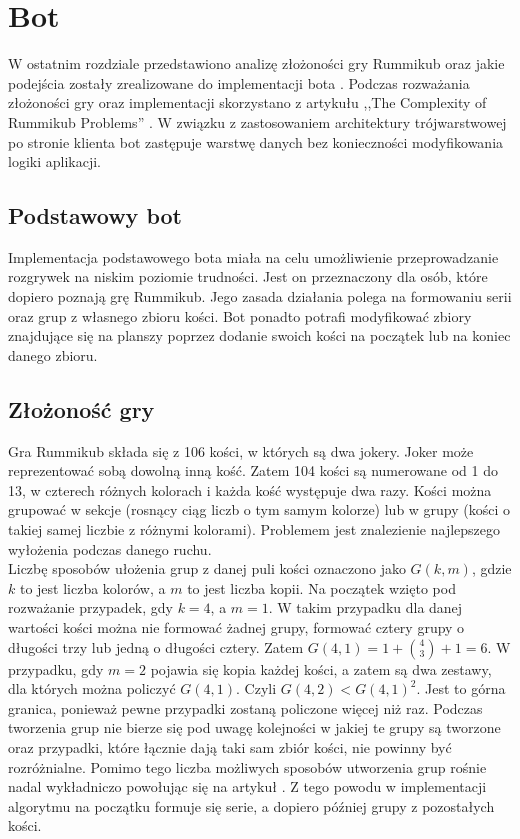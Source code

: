 \chapter{Bot}
\thispagestyle{chapterBeginStyle}

W ostatnim rozdziale przedstawiono analizę złożoności gry Rummikub oraz jakie podejścia zostały zrealizowane do implementacji bota . Podczas rozważania złożoności gry oraz implementacji skorzystano z artykułu ,,The Complexity of Rummikub Problems'' \cite{RummikubComplexity}. W związku z zastosowaniem architektury trójwarstwowej po stronie klienta bot zastępuje  warstwę danych bez konieczności modyfikowania logiki aplikacji.

\section{Podstawowy bot}

Implementacja podstawowego bota miała na celu umożliwienie przeprowadzanie rozgrywek na niskim poziomie trudności. Jest on przeznaczony dla osób, które dopiero poznają grę Rummikub. Jego zasada działania polega na formowaniu serii oraz grup z własnego zbioru kości. Bot ponadto potrafi modyfikować zbiory znajdujące się na planszy poprzez dodanie swoich kości na początek lub na koniec danego zbioru.

\section{Złożoność gry}

Gra Rummikub składa się z 106 kości, w których są dwa jokery. Joker może reprezentować sobą dowolną inną kość. Zatem 104 kości są numerowane od 1 do 13, w czterech różnych kolorach i każda kość występuje dwa razy. Kości można grupować w sekcje (rosnący ciąg liczb o tym samym kolorze) lub w grupy (kości o takiej samej liczbie z różnymi kolorami). Problemem jest znalezienie najlepszego wyłożenia podczas danego ruchu. \\

 Liczbę sposobów ułożenia grup z danej puli kości oznaczono jako $G(k, m)$, gdzie $k$ to jest liczba kolorów, a $m$ to jest liczba kopii. Na początek wzięto pod rozważanie przypadek, gdy $k = 4$, a $m = 1$. W takim przypadku dla danej wartości kości można nie formować żadnej grupy, formować cztery grupy o długości trzy lub jedną o długości cztery. Zatem $G(4,1) = 1 + {{4}\choose{3}} + 1 = 6$. W przypadku, gdy $m = 2$ pojawia się kopia każdej kości, a zatem są dwa zestawy, dla których można policzyć $G(4,1)$. Czyli $G(4,2) < G(4,1)^2$. Jest to górna granica, ponieważ pewne przypadki zostaną policzone więcej niż raz. Podczas tworzenia grup nie bierze się pod uwagę kolejności w jakiej te grupy są tworzone oraz przypadki, które łącznie dają taki sam zbiór kości, nie powinny być rozróżnialne. Pomimo tego liczba możliwych sposobów utworzenia grup rośnie nadal wykładniczo powołując się na artykuł \cite{RummikubComplexity}. Z tego powodu w implementacji algorytmu na początku formuje się serie, a dopiero później grupy z pozostałych kości. \\

